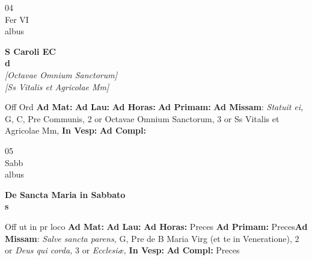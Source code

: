\documentclass[10pt, openany]{book}
\begin{document}
        \begin{center}
            \begin{minipage}{3.5in}
                \vspace{2em}
                \begin{minipage}{0.5in}
                    {\Huge 04} \\
                    {\normalsize Fer VI} \\
                    {\normalsize albus}
                \end{minipage}
                \begin{minipage}{3.0in}
                    \textbf{ \large S Caroli EC \\
                    \textnormal{\normalsize d}} \\ \textit{[Octavae Omnium Sanctorum]} \\ \textit{[Ss Vitalis et Agricolae Mm]} \\ 
                \end{minipage}
                \begin{justify}Off Ord
                    \textbf{Ad Mat: }
                    \textbf{Ad Lau: }
                    \textbf{Ad Horas: }
                    \textbf{Ad Primam: }\textbf{Ad Missam}: \textit{Statuit ei,} G, C, Pre Communis, 2 or Octavae Omnium Sanctorum, 3 or Ss Vitalis et Agricolae Mm,  
                    \textbf{In Vesp: }
                    \textbf{Ad Compl: }
                \end{justify}
            \end{minipage}
        \end{center}
    
        \begin{center}
            \begin{minipage}{3.5in}
                \vspace{2em}
                \begin{minipage}{0.5in}
                    {\Huge 05} \\
                    {\normalsize Sabb} \\
                    {\normalsize albus}
                \end{minipage}
                \begin{minipage}{3.0in}
                    \textbf{ \large De Sancta Maria in Sabbato \\
                    \textnormal{\normalsize s}} \\ 
                \end{minipage}
                \begin{justify}Off ut in pr loco
                    \textbf{Ad Mat: }
                    \textbf{Ad Lau: }
                    \textbf{Ad Horas: }Preces
                    \textbf{Ad Primam: }Preces\textbf{Ad Missam}: \textit{Salve sancta parens,} G, Pre de B Maria Virg (et te in Veneratione), 2 or \textit{Deus qui corda,} 3 or \textit{Ecclesiæ,}  
                    \textbf{In Vesp: }
                    \textbf{Ad Compl: }Preces
                \end{justify}
            \end{minipage}
        \end{center}
    
\end{document}

